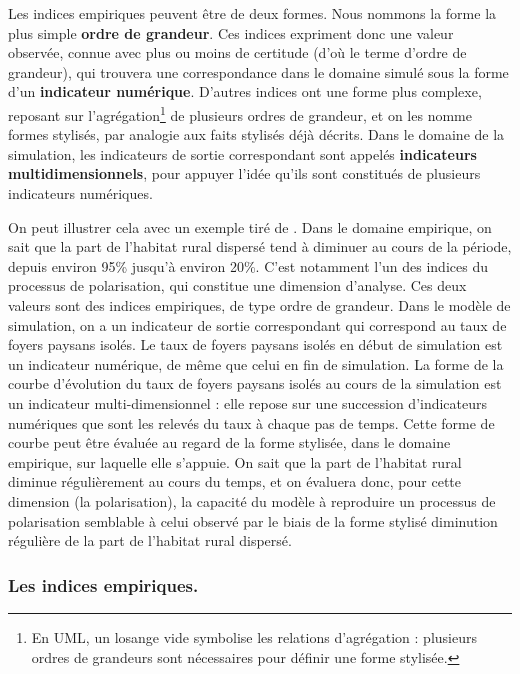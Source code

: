 Les indices empiriques peuvent être de deux formes.
Nous nommons la forme la plus simple \og \textbf{ordre de grandeur}\fg{}.
Ces indices expriment donc une valeur observée, connue avec plus ou moins de certitude (d'où le terme d'ordre de grandeur), qui trouvera une correspondance dans le domaine simulé sous la forme d'un \textbf{indicateur numérique}.
D'autres indices ont une forme plus complexe, reposant sur l'agrégation\footnote{
En UML, un losange vide symbolise les relations d'agrégation : plusieurs ordres de grandeurs sont nécessaires pour définir une forme stylisée.
} de plusieurs ordres de grandeur, et on les nomme \og formes stylisés\fg{}, par analogie aux faits stylisés déjà décrits.
Dans le domaine de la simulation, les indicateurs de sortie correspondant sont appelés \og \textbf{indicateurs multidimensionnels}\fg{}, pour appuyer l'idée qu'ils sont constitués de plusieurs indicateurs numériques.

On peut illustrer cela avec un exemple tiré de \simfeodal{}.
Dans le domaine empirique, on sait que la part de l'habitat rural dispersé tend à diminuer au cours de la période, depuis environ 95\% jusqu'à environ 20\%.
C'est notamment l'un des indices du processus de polarisation, qui constitue une dimension d'analyse.
Ces deux valeurs sont des indices empiriques, de type \og ordre de grandeur\fg{}.
Dans le modèle de simulation, on a un indicateur de sortie correspondant qui correspond au taux de foyers paysans isolés.
Le taux de foyers paysans isolés en début de simulation est un indicateur numérique, de même que celui en fin de simulation.
La forme de la courbe d'évolution du taux de foyers paysans isolés au cours de la simulation est un indicateur multi-dimensionnel : elle repose sur une succession d'indicateurs numériques que sont les relevés du taux à chaque pas de temps.
Cette forme de courbe peut être évaluée au regard de la forme stylisée, dans le domaine empirique, sur laquelle elle s'appuie.
On sait que la part de l'habitat rural diminue régulièrement au cours du temps, et on évaluera donc, pour cette dimension (la polarisation), la capacité du modèle à reproduire un processus de polarisation semblable à celui observé par le biais de la forme stylisé \og diminution régulière de la part de l'habitat rural dispersé\fg{}.


\subsubsection{Les indices empiriques.}

